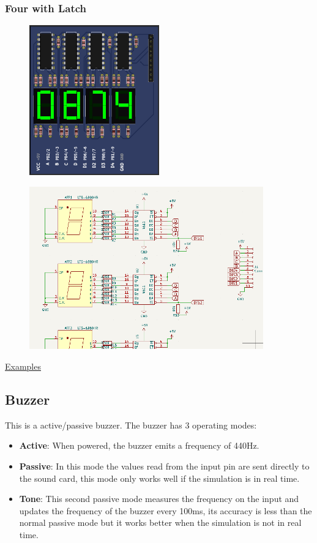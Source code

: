 \subsubsection{Four with Latch}
\begin{figure}[H]
\center
\includegraphics[width=0.5\textwidth]{img/part_7seg_latch.png} 
\end{figure} 


\begin{figure}[H]
\center
\includegraphics[width=0.9\textwidth]{img/part_7seg_latch_.png} 
\end{figure} 

\href{https://lcgamboa.github.io/picsimlab_examples/parts_7_Segments_Display_(Decoder).html}{Examples}

\subsection{Buzzer}

This is a active/passive buzzer.
The buzzer has 3 operating modes: 
\begin{itemize}
\item \textbf{Active}: When powered, the buzzer emits a frequency of 440Hz. 
\item \textbf{Passive}: In this mode the values read from the input pin are sent directly to the sound card, this mode only works well if the simulation is in real time. 
\item \textbf{Tone}: This second passive mode measures the frequency on the input and updates the frequency of the buzzer every 100ms, its accuracy is less than the normal passive mode but it works better when the simulation is not in real time. 
\end{itemize}


